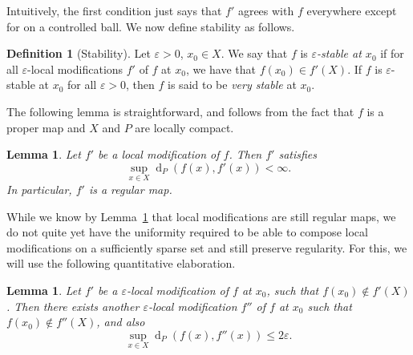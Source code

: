 \documentclass[11pt,a4paper]{amsart}
\DeclareMathOperator{\dist}{d}
\newtheorem{lemma}[theorem]{Lemma}
\theoremstyle{definition}
\newtheorem{definition}[theorem]{Definition}
\begin{document}
Intuitively, the first condition just says that $f'$ agrees with $f$ everywhere except for on a controlled ball. 
We now define stability as follows.

\begin{definition}[Stability]\label{defn:stability}
    Let $\varepsilon > 0$, $x_0 \in X$. We say that $f$ is \emph{$\varepsilon$-stable at $x_0$} if for all $\varepsilon$-local modifications $f'$ of $f$ at $x_0$, we have that $f(x_0) \in f'(X)$.
    If $f$ is $\varepsilon$-stable at $x_0$ for all $\varepsilon > 0$, then $f$ is said to be \emph{very stable} at $x_0$. 
\end{definition}

The following lemma is straightforward, and follows from the fact that $f$ is a proper map and $X$ and $P$ are locally compact.

\begin{lemma}\label{lem:local-mod-regular}
    Let $f'$ be a local modification of $f$. Then $f'$ satisfies
    $$
    \sup_{x \in X} \dist_P(f(x), f'(x)) < \infty.
    $$ 
    In particular, $f'$ is a regular map.
\end{lemma}






While we know by Lemma~\ref{lem:local-mod-regular} that local modifications are still regular maps, we do not quite yet have the uniformity required to be able to compose local modifications on a sufficiently sparse set and still preserve regularity. For this, we will use the following quantitative elaboration.

\begin{lemma}\label{lem:bounded-local-mod}
    Let $f'$ be a $\varepsilon$-local modification of $f$ at $x_0$, such that $f(x_0) \not\in f'(X)$. Then there exists another $\varepsilon$-local modification $f''$ of $f$ at $x_0$ such that  $f(x_0) \not\in f''(X)$, and also 
    $$
    \sup_{x \in X} \dist_P(f(x), f''(x)) \leq 2\varepsilon.
    $$ 
\end{lemma}
\end{document}

